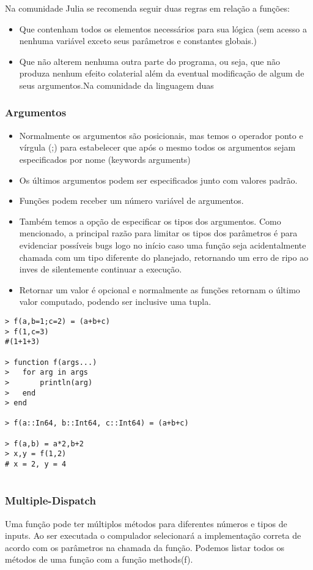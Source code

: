 Na comunidade Julia se recomenda seguir duas regras em relação a funções:%
\begin{itemize}
    \item Que contenham todos os elementos necessários para sua lógica (sem acesso a nenhuma variável exceto seus parâmetros e constantes globais.)
    \item Que não alterem nenhuma outra parte do programa, ou seja, que não produza nenhum efeito colaterial além da eventual modificação de algum de seus argumentos.Na comunidade da linguagem duas 
\end{itemize}

\subsubsection{Argumentos}
\begin{itemize} %
    \item Normalmente os argumentos são posicionais, mas temos o operador ponto e vírgula (;) para estabelecer que após o mesmo todos os argumentos sejam especificados por nome (keywords arguments)
    \item Os últimos argumentos podem ser especificados junto com valores padrão.
    \item Funções podem receber um número variável de argumentos. 
    \item Também temos a opção de especificar os tipos dos argumentos. Como mencionado, a principal razão para limitar os tipos dos parâmetros é para evidenciar possíveis bugs logo no início caso uma função seja acidentalmente chamada com um tipo diferente do planejado, retornando um erro de ripo ao inves de silentemente continuar a execução.
    \item Retornar um valor é opcional e normalmente as funções retornam o último valor computado, podendo ser inclusive uma tupla.
\end{itemize}
\begin{lstlisting}
> f(a,b=1;c=2) = (a+b+c) 
> f(1,c=3) 
#(1+1+3)

> function f(args...)
> 	for arg in args
> 		println(arg)
> 	end
> end

> f(a::In64, b::Int64, c::Int64) = (a+b+c)

> f(a,b) = a*2,b+2
> x,y = f(1,2) 
# x = 2, y = 4
    
\end{lstlisting}

\subsubsection{Multiple-Dispatch}
Uma função pode ter múltiplos métodos para diferentes números e tipos de inputs. Ao ser executada o compulador selecionará a implementação correta de acordo com os parâmetros na chamada da função. Podemos listar todos os métodos de uma função com a função methods(f).

